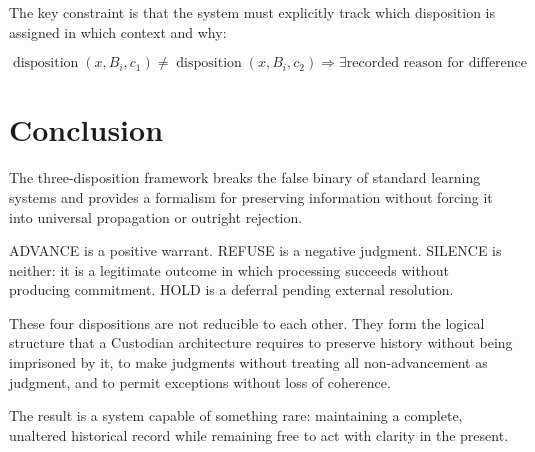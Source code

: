 \documentclass[12pt]{article}
\begin{document}
The key constraint is that the system must explicitly track which disposition is assigned in which context and why:

\begin{equation}
\operatorname{disposition}(x, B_i, c_1) \neq \operatorname{disposition}(x, B_i, c_2) \Rightarrow \exists \text{recorded reason for difference}
\end{equation}

\section{Conclusion}

The three-disposition framework breaks the false binary of standard learning systems and provides a formalism for preserving information without forcing it into universal propagation or outright rejection.

ADVANCE is a positive warrant. REFUSE is a negative judgment. SILENCE is neither: it is a legitimate outcome in which processing succeeds without producing commitment. HOLD is a deferral pending external resolution.

These four dispositions are not reducible to each other. They form the logical structure that a Custodian architecture requires to preserve history without being imprisoned by it, to make judgments without treating all non-advancement as judgment, and to permit exceptions without loss of coherence.

The result is a system capable of something rare: maintaining a complete, unaltered historical record while remaining free to act with clarity in the present.
\end{document}
